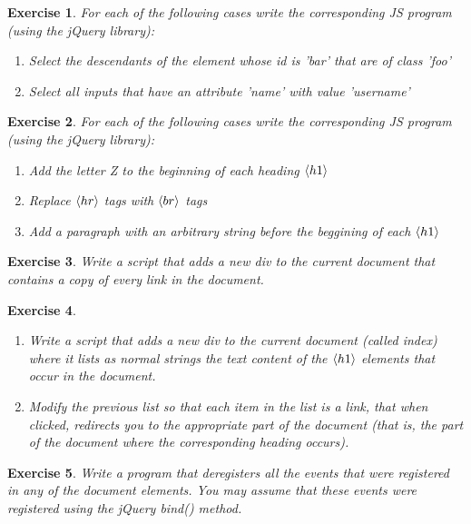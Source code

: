 \documentclass{article}
\newtheorem{ex}{Exercise}[section]
\begin{document}
\begin{ex}
For each of the following cases write the corresponding JS program (using the 
jQuery library): 
\begin{enumerate}
  \item Select the descendants of the element whose id is 'bar' that are of class 
        'foo' 
  \item Select all inputs that have an attribute 'name' with value 'username'
\end{enumerate}
\end{ex}

\begin{ex}
For each of the following cases write the corresponding JS program (using the 
jQuery library): 
\begin{enumerate}
   \item Add the letter Z to the beginning of each heading $\langle h1\rangle$
   \item Replace $\langle hr\rangle$ tags with $\langle br\rangle$ tags
   \item Add a paragraph with an arbitrary string before the beggining of each $\langle h1\rangle$
\end{enumerate}
\end{ex}

\begin{ex}
Write a script that adds a new div to the current document that contains  
a copy of every link in the document. 
\end{ex}

\begin{ex}
$\phantom{xxx}$
\begin{enumerate}
 \item Write a script that adds a new div to the current document (called index) 
       where it lists as normal strings the text content of the $\langle h1\rangle$ elements 
       that occur in the document.
 \item Modify the previous list so that each item in the list is a link, 
       that when clicked, redirects you to the appropriate part of the document
       (that is, the part of the document where the corresponding heading 
       occurs).  
\end{enumerate} 
\end{ex}

\begin{ex} 
Write a program that deregisters all the events that were registered in any of the 
document elements. You may assume that these events were registered using the jQuery 
bind() method.  
\end{ex}
\end{document}
